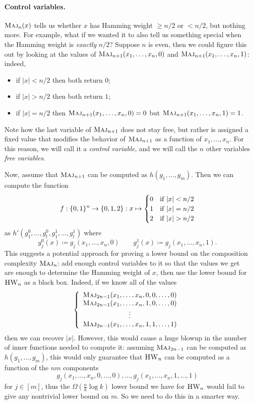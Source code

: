 \documentclass[10pt,a4paper]{article}
\theoremstyle{definition}
\theoremstyle{remark}
\newcommand{\mathsc}[1]{{\normalfont\textsc{#1}}}
\DeclarePairedDelimiter{\set}{\{}{\}}
\DeclareMathOperator{\Maj}{\mathsc{Maj}}
\DeclareMathOperator{\HW}{\mathsc{HW}}
\newcommand{\zo}{\set{0,1}}
\begin{document}
\paragraph*{Control variables.}
$\Maj_n(x)$ tells us whether $x$ has Hamming weight $\geq n/2$ or $< n/2$, but nothing more.
For example, what if we wanted it to also tell us something special when the Hamming weight is \emph{exactly} $n/2$?
Suppose $n$ is even, then we could figure this out by looking at the values of $\Maj_{n+1}(x_1, \ldots, x_n, 0)$ and $\Maj_{n+1}(x_1, \ldots, x_n, 1)$: indeed,
\begin{itemize}
    \item if $|x|< n/2$ then both return $0$;
    \item if $|x|>n/2$ then both return $1$;
    \item if $|x|=n/2$ then $\Maj_{n+1}(x_1, \ldots, x_n, 0)=0$ but $\Maj_{n+1}(x_1, \ldots, x_n, 1)=1$.
\end{itemize}
Note how the last variable of $\Maj_{n+1}$ does not stay free, but rather is assigned a fixed value that modifies the behavior of $\Maj_{n+1}$ as a function of $x_1,\ldots, x_n$.
For this reason, we will call it a \emph{control variable}, and we will call the $n$ other variables \emph{free variables}.

Now, assume that $\Maj_{n+1}$ can be computed as $h(g_1, \ldots, g_m)$.
Then we can compute the function
\[
f: \zo^n \to \set{0,1,2}: x \mapsto
\begin{cases}
0 & \text{if $|x|<n/2$}\\
1 & \text{if $|x|=n/2$}\\
2 & \text{if $|x|>n/2$}
\end{cases}
\]
as $h'(g^0_1, \ldots, g^0_l, g^1_1, \ldots, g^1_l)$ where
\[
g^0_j(x) \coloneqq g_j(x_1, \ldots, x_n, 0) \qquad g^1_j(x) \coloneqq g_j(x_1, \ldots, x_n, 1).
\]
This suggests a potential approach for proving a lower bound on the composition complexity $\Maj_n$: add enough control variables to it so that the values we get are enough to determine the Hamming weight of $x$, then use the lower bound for $\HW_n$ as a black box.
Indeed, if we know all of the values
\[
\left\{
\begin{array}{c}
     \Maj_{2n-1}(x_1, \ldots, x_n, 0, 0, \ldots, 0) \\
     \Maj_{2n-1}(x_1, \ldots, x_n, 1, 0, \ldots, 0) \\
     \vdots\\
     \Maj_{2n-1}(x_1, \ldots, x_n, 1, 1, \ldots, 1)
\end{array}
\right.
\]
then we can recover $|x|$.
However, this would cause a huge blowup in the number of inner functions needed to compute it:
assuming $\Maj_{2n-1}$ can be computed as $h(g_1, \ldots, g_m)$, this would only guarantee that $\HW_n$ can be computed as a function of the $nm$ components 
\[g_j(x_1, \ldots, x_n, 0, \ldots, 0), \ldots, g_j(x_1, \ldots, x_n, 1, \ldots, 1)\]
for $j \in [m]$, thus the $\Omega(\frac{n}{k}\log k)$ lower bound we have for $\HW_n$ would fail to give any nontrivial lower bound on $m$.
So we need to do this in a smarter way.
\end{document}

